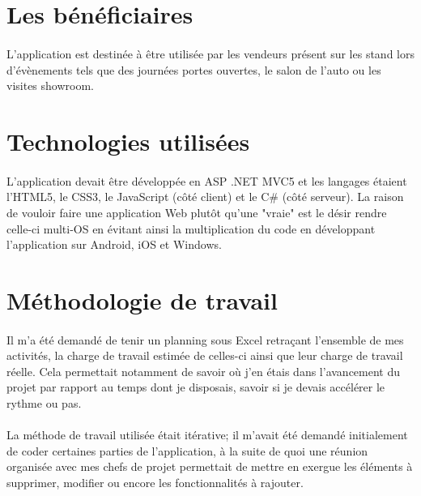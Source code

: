 \documentclass[12pt]{report}
\begin{document}
\section{Les bénéficiaires}
\paragraph{}
L'application est destinée à être utilisée par les vendeurs présent sur les stand lors d'évènements tels que des journées portes ouvertes, le salon de l'auto ou les visites showroom.

\section{Technologies utilisées}
\paragraph{}
L'application devait être développée en ASP .NET MVC5 et les langages étaient l'HTML5, le CSS3, le JavaScript (côté client) et le C\# (côté serveur). La raison de vouloir faire une application Web plutôt qu'une "vraie" est le désir rendre celle-ci multi-OS en évitant ainsi la multiplication du code en développant l'application sur Android, iOS et Windows.

\section{Méthodologie de travail}
\paragraph{}
Il m'a été demandé de tenir un planning sous Excel retraçant l'ensemble de mes activités, la charge de travail estimée de celles-ci ainsi que leur charge de travail réelle.
Cela permettait notamment de savoir où j'en étais dans l'avancement du projet par rapport au temps dont je disposais, savoir si je devais accélérer le rythme ou pas.

\paragraph{}
La méthode de travail utilisée était itérative; il m’avait été demandé initialement de coder certaines parties de l’application, à la suite de quoi une réunion organisée avec mes chefs de projet permettait de mettre en exergue les éléments à supprimer, modifier ou encore les fonctionnalités à rajouter.
\end{document}
